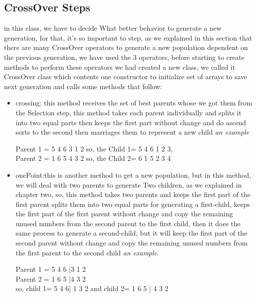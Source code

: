 \subsection{CrossOver Steps}
in this class, we have to decide What better behavior to generate a new generation, for that, it's so important to step, as we explained in this section that there are many CrossOver operators to generate a new population dependent on the previous generation, we have used the 3 operators, before starting to create methods to perform these operators we had created a new class, we called it CrossOver class which contents one constructor to initialize set of arrays to save next generation and calls some methods that follow:
\begin{itemize}
    \item{\textsf{crossing:}  this method receives the set of best parents whose we got them from the Selection step, this method takes each parent individually and splits it into two equal parts then keeps the first part without change and do ascend sorts to the second then marriages them to represent a new child \textit{an example}
    \begin{tcolorbox}[breakable,notitle,boxrule=0pt,colback=blue!20,colframe=blue!20]
        {Parent 1 = 5 4 6 3 1 2 so, the Child 1= 5 4 6 1 2 3,\\
         Parent 2 = 1 6 5 4 3 2 so, the Child 2= 6 1 5 2 3 4}
        \end{tcolorbox}
    }
    \item{\textsf{onePoint:}this is another method to get a new population, but in this method, we will deal with two parents to generate Two children, as we explained in chapter two, so, this method takes two parents and keeps the first part of the first parent splits them into two equal parts for generating a first-child, keeps the first part of the first parent without change and copy the remaining unused numbers from the second parent to the first child, then it does the same process to generate a second-child, but it will keep the first part of the second parent without change and copy the remaining unused numbers from the first parent to the second child \textit{an example}.
    \begin{tcolorbox}[breakable,notitle,boxrule=0pt,colback=blue!20,colframe=blue!20]
        {Parent 1 = 5 4 6 |3 1 2\\ Parent 2 = 1 6 5 |4 3 2 \\
         so, child 1= 5 4 6| 1 3 2 and child 2= 1 6 5 | 4 3 2}
        \end{tcolorbox}
}
\end{itemize}
